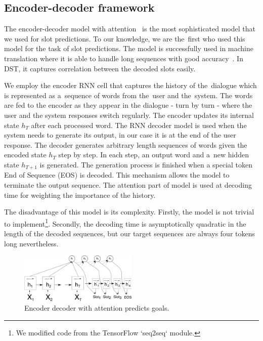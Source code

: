 \documentclass{itatnew}
\begin{document}
\subsection{Encoder-decoder framework}
\label{sec:encdec}
The encoder-decoder model with attention~\cite{bahdanau2014neural} is the most sophisticated model that we used for slot predictions.
To our knowledge, we are the~first who used this model for the task of slot predictions.
The model is successfully used in machine translation where it is able to handle long sequences with good accuracy~\cite{bahdanau2014neural}.
In DST, it captures correlation between the decoded slots easily. 

We employ the encoder RNN cell that captures the history of the~dialogue which is represented as a~sequence of words from the~user and the~system.
The words are fed to the encoder as they appear in the dialogue - turn by turn - where the user and the system responses switch regularly.
The encoder updates its internal state $h_T$ after each processed word.
The RNN decoder model is used when the system needs to generate its output, in our case it is at the end of the user response.
The decoder generates arbitrary length sequences of words given the encoded state $h_T$ step by step.
In each step, an output word and a~new hidden state $h_{T+1}$ is generated.
The generation process is finished when a special token End of Sequence (EOS) is decoded.
This mechanism allows the model to terminate the output sequence.
The attention part of model is used at decoding time for weighting the importance of the history. 

The disadvantage of this model is its complexity.
Firstly, the model is not trivial to implement\footnote{We modified code from the TensorFlow `seq2seq` module.}. 
Secondly, the decoding time is asymptotically quadratic in the length of the decoded sequences, but our target sequences are always four tokens long nevertheless.
\begin{figure}
\includegraphics[width=0.5\textwidth]{encdec}
\caption{Encoder decoder with attention predicts goals.}
\label{fig:encdec}
\end{figure}
\end{document}
